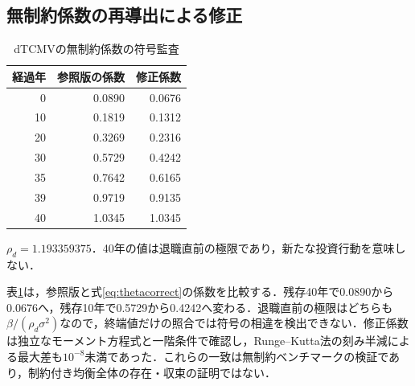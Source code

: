 \documentclass[10pt,a4paper]{article}
\numberwithin{equation}{section}
\numberwithin{table}{section}
\numberwithin{figure}{section}
\theoremstyle{plain}
\theoremstyle{definition}
\begin{document}
\subsection{無制約係数の再導出による修正}
\begin{table}[htbp]\centering\small
\caption{dTCMVの無制約係数の符号監査}\label{tab:theta}
\begin{tabular}{rrr}
\toprule
経過年 & 参照版の係数 & 修正係数 \\ \midrule
0 & 0.0890 & 0.0676 \\
10 & 0.1819 & 0.1312 \\
20 & 0.3269 & 0.2316 \\
30 & 0.5729 & 0.4242 \\
35 & 0.7642 & 0.6165 \\
39 & 0.9719 & 0.9135 \\
40 & 1.0345 & 1.0345 \\
\bottomrule\end{tabular}
\par\vspace{3pt}\begin{minipage}{0.97\textwidth}\footnotesize $\rho_d=1.193359375$．40年の値は退職直前の極限であり，新たな投資行動を意味しない．\end{minipage}
\end{table}
表\ref{tab:theta}は，参照版と式\eqref{eq:thetacorrect}の係数を比較する．残存40年で0.0890から0.0676へ，残存10年で0.5729から0.4242へ変わる．退職直前の極限はどちらも$\beta/(\rho_d\sigma^2)$なので，終端値だけの照合では符号の相違を検出できない．修正係数は独立なモーメント方程式と一階条件で確認し，Runge--Kutta法の刻み半減による最大差も$10^{-8}$未満であった．これらの一致は無制約ベンチマークの検証であり，制約付き均衡全体の存在・収束の証明ではない．
\end{document}

